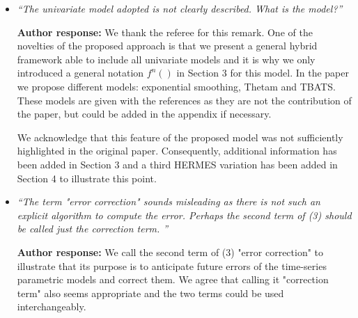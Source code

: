 \documentclass[10pt]{article} %
\begin{document}
\begin{itemize}
	
	\item {\em ``The univariate model adopted is not clearly described. What is the model?''} \medskip
	
	\textbf{Author response:} We thank the referee for this remark. One of the novelties of the proposed approach is that we present a general hybrid framework able to include all univariate models and it is why we only introduced a general notation $f^n()$ in Section 3 for this model. In the paper we propose different models: exponential smoothing, Thetam and TBATS. These models are given with the references as they are not the contribution of the paper, but could be added in the appendix if necessary.


We acknowledge that this feature of the proposed model was not sufficiently highlighted in the original paper. Consequently, additional information has been added in Section 3 and a third HERMES variation has been added in Section 4 to illustrate this point.\\
	
	\item {\em ``The term "error correction" sounds misleading as there is not such an explicit algorithm to compute the error. Perhaps the second term of (3) should be called just the correction term. ''} \medskip
	
	\textbf{Author response:} We call the second term of (3) "error correction" to illustrate that its purpose is to anticipate future errors of the time-series parametric models and correct them. We agree that calling it "correction term" also seems appropriate and the two terms could be used interchangeably.\\
	

\end{itemize}
\end{document}

